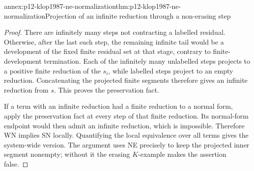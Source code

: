\begin{annexitem}{annex:p12-klop1987-ne-normalization}{thm:p12-klop1987-ne-normalization}{Projection of an infinite reduction through a non-erasing step}
\begin{proof}
There are infinitely many steps not contracting a labelled residual.
Otherwise, after the last such step, the remaining infinite tail would
be a development of the fixed finite residual set at that stage, contrary
to finite-development termination. Each of the infinitely many unlabelled
steps projects to a positive finite reduction of the \(s_i\), while
labelled steps project to an empty reduction. Concatenating the projected
finite segments therefore gives an infinite reduction from \(s\).
This proves the preservation fact.

If a term with an infinite reduction had a finite reduction to a normal
form, apply the preservation fact at every step of that finite reduction.
Its normal-form endpoint would then admit an infinite reduction, which
is impossible. Therefore WN implies SN locally. Quantifying the local
equivalence over all terms gives the system-wide version. The argument
uses NE precisely to keep the projected inner segment nonempty; without
it the erasing \(K\)-example makes the assertion false.
\end{proof}
\end{annexitem}


